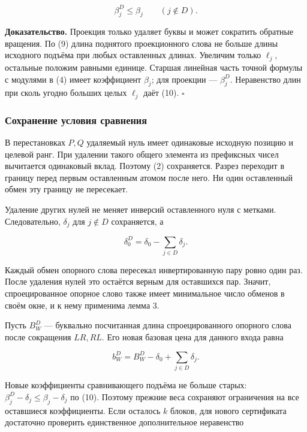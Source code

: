 \documentclass[
  11pt,
  a4paper,
]{article}
\begin{document}
\[\beta_j^D\le\beta_j\qquad(j\notin D).\tag{10}\]

\textbf{Доказательство.} Проекция только удаляет буквы и может сократить
обратные вращения. По (9) длина поднятого проекционного слова не больше
длины исходного подъёма при любых оставленных длинах. Увеличим только
\(\ell_j\), остальные положим равными единице. Старшая линейная часть
точной формулы с модулями в (4) имеет коэффициент \(\beta_j\); для
проекции --- \(\beta_j^D\). Неравенство длин при сколь угодно больших
целых \(\ell_j\) даёт (10). \(\square\)

\hypertarget{ux441ux43eux445ux440ux430ux43dux435ux43dux438ux435-ux443ux441ux43bux43eux432ux438ux44f-ux441ux440ux430ux432ux43dux435ux43dux438ux44f}{%
\subsubsection{Сохранение условия
сравнения}\label{ux441ux43eux445ux440ux430ux43dux435ux43dux438ux435-ux443ux441ux43bux43eux432ux438ux44f-ux441ux440ux430ux432ux43dux435ux43dux438ux44f}}

В перестановках \(P,Q\) удаляемый нуль имеет одинаковые исходную позицию
и целевой ранг. При удалении такого общего элемента из префиксных чисел
вычитается одинаковый вклад. Поэтому (2) сохраняется. Разрез переходит в
границу перед первым оставленным атомом после него. Ни один оставленный
обмен эту границу не пересекает.

Удаление других нулей не меняет инверсий оставленного нуля с метками.
Следовательно, \(\delta_j\) для \(j\notin D\) сохраняется, а

\[\delta_0^D=\delta_0-\sum_{j\in D}\delta_j.\tag{11}\]

Каждый обмен опорного слова пересекал инвертированную пару ровно один
раз. После удаления нулей это остаётся верным для оставшихся пар.
Значит, спроецированное опорное слово также имеет минимальное число
обменов в своём окне, и к нему применима лемма 3.

Пусть \(B_W^D\) --- буквально посчитанная длина спроецированного
опорного слова после сокращения \(LR,RL\). Его новая базовая цена для
данного входа равна

\[b_W^D=B_W^D-\delta_0+\sum_{j\in D}\delta_j.\tag{12}\]

Новые коэффициенты сравнивающего подъёма не больше старых:
\(\beta_j^D-\delta_j\le\beta_j-\delta_j\) по (10). Поэтому прежние веса
сохраняют ограничения на все оставшиеся коэффициенты. Если осталось
\(k\) блоков, для нового сертификата достаточно проверить единственное
дополнительное неравенство
\end{document}
